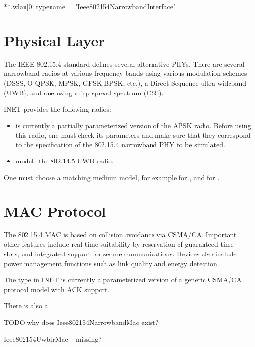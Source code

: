 \begin{inifile}
**.wlan[0].typename = "Ieee802154NarrowbandInterface"
\end{inifile}

\section{Physical Layer}

The IEEE 802.15.4 standard defines several alternative PHYs. There are
several narrowband radios at various frequency bands using various modulation
schemes (DSSS, O-QPSK, MPSK, GFSK BPSK, etc.), a Direct Sequence ultra-wideband
(UWB), and one using chirp spread spectrum (CSS).

INET provides the following radios: 

\begin{itemize}
  \item {} is currently a partially 
    parameterized version of the APSK radio. Before using this radio, 
    one must check its parameters and make sure that they correspond to the 
    specification of the 802.15.4 narrowband PHY to be simulated. 
  \item {} models the 802.14.5 UWB radio. 
\end{itemize}

One must choose a matching medium model, for example
 for ,
and  for
.


\section{MAC Protocol}

The 802.15.4 MAC is based on collision avoidance via CSMA/CA. Important other
features include real-time suitability by reservation of guaranteed time slots,
and integrated support for secure communications. Devices also include power
management functions such as link quality and energy detection.

The  type in INET is currently a parameterized
version of a generic CSMA/CA protocol model with ACK support.

There is also a .

TODO why does Ieee802154NarrowbandMac exist?

Ieee802154UwbIrMac -- missing?



